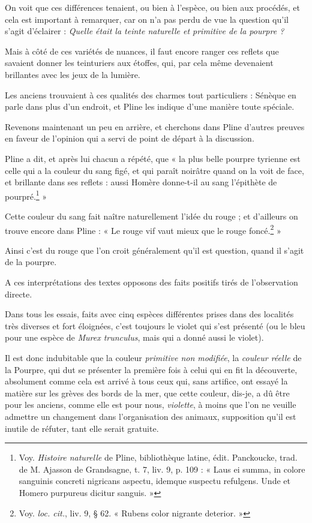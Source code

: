 \documentclass[a4paper, 11pt, oneside, polutonikogreek, french]{article}
\begin{document}
On voit que ces différences tenaient, ou bien à l'espèce, ou bien aux procédés, et cela est important à remarquer, car on n'a pas perdu de vue la question qu'il s'agit d'éclairer : \emph{Quelle était la teinte naturelle et primitive de la pourpre ?}

Mais à côté de ces variétés de nuances, il faut encore ranger ces reflets que savaient donner les teinturiers aux étoffes, qui, par cela même devenaient brillantes avec les jeux de la lumière.

Les anciens trouvaient à ces qualités des charmes tout particuliers : Sénèque en parle dans plus d'un endroit, et Pline les indique d'une manière toute spéciale.

Revenons maintenant un peu en arrière, et cherchons dans Pline d'autres preuves en faveur de l'opinion qui a servi de point de départ à la discussion.

Pline a dit, et après lui chacun a répété, que « la plus belle pourpre tyrienne est celle qui a la couleur du sang figé, et qui paraît noirâtre quand on la voit de face, et brillante dans ses reflets : aussi Homère donne-t-il au sang l'épithète de pourpré.\footnote{Voy. \emph{Histoire naturelle} de Pline, bibliothèque latine, édit. Panckoucke, trad. de M. Ajasson de Grandsagne, t. 7, liv. 9, p. 109 : « Laus ei summa, in colore sanguinis concreti nigricans aspectu, idemque suspectu refulgens. Unde et Homero purpureus dicitur sanguis. »} »

Cette couleur du sang fait naître naturellement l'idée du rouge ; et d'ailleurs on trouve encore dans Pline : « Le rouge vif vaut mieux que le rouge foncé.\footnote{Voy. \emph{loc. cit.}, liv. 9, § 62. « Rubens color nigrante deterior. »} »

Ainsi c'est du rouge que l'on croit généralement qu'il est question, quand il s'agit de la pourpre.

A ces interprétations des textes opposons des faits positifs tirés de l'observation directe.

Dans tous les essais, faits avec cinq espèces différentes prises dans des localités très diverses et fort éloignées, c'est toujours le violet qui s'est présenté (ou le bleu pour une espèce de \emph{Murex trunculus}, mais qui a donné aussi le violet).

Il est donc indubitable que la couleur \emph{primitive non modifiée}, la \emph{couleur réelle} de la Pourpre, qui dut se présenter la première fois à celui qui en fit la découverte, absolument comme cela est arrivé à tous ceux qui, sans artifice, ont essayé la matière sur les grèves des bords de la mer, que cette couleur, dis-je, a dû être pour les anciens, comme elle est pour nous, \emph{violette}, à moins que l'on ne veuille admettre un changement dans l'organisation des animaux, supposition qu'il est inutile de réfuter, tant elle serait gratuite.
\end{document}
